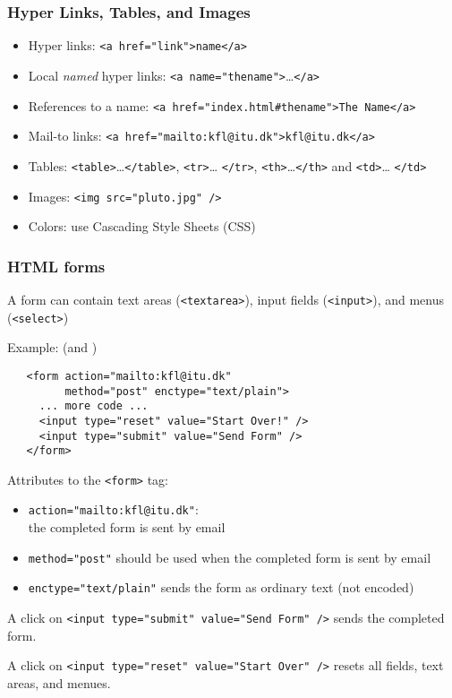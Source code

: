 \documentclass[dvipsnames]{beamer}
\begin{document}
\begin{frame}
\frametitle{Hyper Links, Tables, and Images}
\begin{itemize}
\item Hyper links: \texttt{<a href="link">name</a>}
\item Local \emph{named} hyper links: \texttt{<a
    name="thename">}\ldots\texttt{</a>}
\item References to a name: \texttt{<a href="index.html\#thename">The Name</a>}
\item Mail-to links: \texttt{<a href="mailto:kfl@itu.dk">kfl@itu.dk</a>}
\item Tables: \texttt{<table>}\ldots \texttt{</table>}, \texttt{<tr>}\ldots
  \texttt{</tr>}, \texttt{<th>}\ldots \texttt{</th>} and \texttt{<td>}\ldots
  \texttt{</td>}
\item Images: \texttt{<img src="pluto.jpg" />}
\item Colors: use Cascading Style Sheets (CSS)
\end{itemize}
\end{frame}

\begin{frame}[fragile]
\frametitle{HTML forms}
  
A form can contain text areas (\verb+<textarea>+),
input fields (\verb+<input>+), and menus (\verb+<select>+)

Example:  (and )

\begin{verbatim}
   <form action="mailto:kfl@itu.dk" 
         method="post" enctype="text/plain">
     ... more code ...
     <input type="reset" value="Start Over!" />
     <input type="submit" value="Send Form" />
   </form>
\end{verbatim}

Attributes to the \verb+<form>+ tag:

\begin{itemize}
\item \verb+action="mailto:kfl@itu.dk"+:\\ the completed form is sent
  by email
  
\item \verb+method="post"+ should be used when the completed form is
  sent by email
  
\item \verb+enctype="text/plain"+ sends the form as ordinary text
  (not encoded)
\end{itemize}

A click on \verb+<input type="submit" value="Send Form" />+ sends the
completed form.

A click on \verb+<input type="reset" value="Start Over" />+ resets all
fields, text areas, and menues.
\end{frame}
\end{document}
